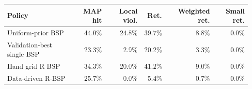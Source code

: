 \begin{tabular}{lrrrrr}
\toprule
Policy & MAP hit & Local viol. & Ret. & Weighted ret. & Small ret. \\
\midrule
Uniform-prior BSP & 44.0\% & 24.8\% & 39.7\% & 8.8\% & 0.0\% \\
Validation-best single BSP & 23.3\% & 2.9\% & 20.2\% & 3.3\% & 0.0\% \\
Hand-grid R-BSP & 34.3\% & 20.0\% & 41.2\% & 9.0\% & 0.0\% \\
Data-driven R-BSP & 25.7\% & 0.0\% & 5.4\% & 0.7\% & 0.0\% \\
\bottomrule
\end{tabular}
